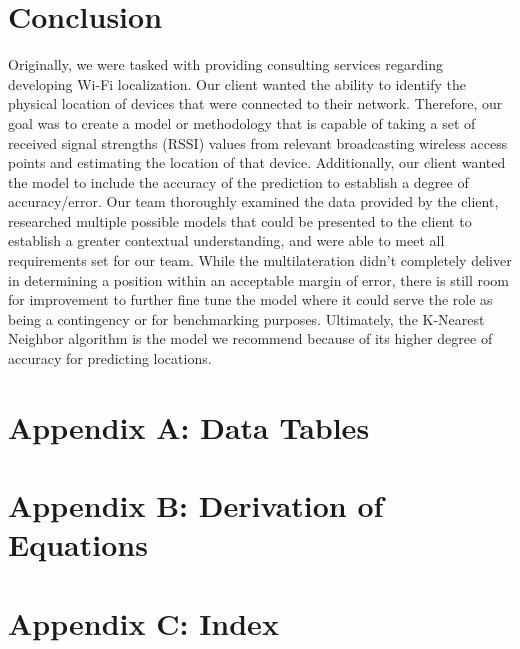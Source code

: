 \documentclass[12pt, conference]{IEEEtran}
\begin{document}
\section{Conclusion}
Originally, we were tasked with providing consulting services regarding developing Wi-Fi localization. Our client wanted the ability to identify the physical location of devices that were connected to their network. Therefore, our goal was to create a model or methodology that is capable of taking a set of received signal strengths (RSSI) values from relevant broadcasting wireless access points and estimating the location of that device. Additionally, our client wanted the model to include the accuracy of the prediction to establish a degree of accuracy/error. Our team thoroughly examined the data provided by the client, researched multiple possible models that could be presented to the client to establish a greater contextual understanding, and were able to meet all requirements set for our team. While the multilateration didn't completely deliver in determining a position within an acceptable margin of error, there is still room for improvement to further fine tune the model where it could serve the role as being a contingency or for benchmarking purposes. Ultimately, the K-Nearest Neighbor algorithm is the model we recommend because of its higher degree of accuracy for predicting locations.


\begin{thebibliography}{00}
\end{thebibliography}
\vspace{12pt}



\section*{Appendix A: Data Tables}


\section*{Appendix B: Derivation of Equations}


\section*{Appendix C: Index}
\end{document}
